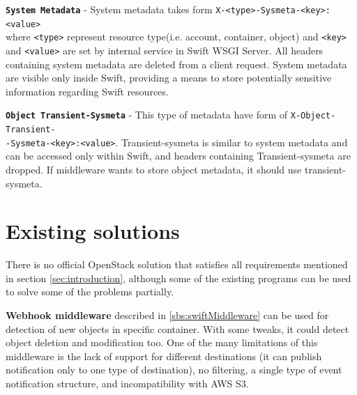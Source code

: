\documentclass{ExcelAtFIT}
\begin{document}
\textbf{\texttt{System Metadata}} - System metadata takes form \texttt{X-<type>-Sysmeta-<key>:<value>}\\ where \texttt{<type>} represent resource type(i.e. account, container, object) and \texttt{<key>} and \texttt{<value>} are set by internal service in Swift WSGI Server. All headers containing system metadata are deleted from a client request. System metadata are visible only inside Swift, providing a means to store potentially sensitive information regarding Swift resources.

\textbf{\texttt{Object Transient-Sysmeta}} - This type of metadata have form of \texttt{X-Object-Transient-\\-Sysmeta-<key>:<value>}. Transient-sysmeta is similar to system metadata and can be accessed only within Swift, and headers containing Transient-sysmeta are dropped. If middleware wants to store object metadata, it should use transient-sysmeta\cite{swiftMiddleware}.


\section{Existing solutions}\label{sec:existingSolutions}
There is no official OpenStack solution that satisfies all requirements mentioned in section \ref{sec:introduction}, although some of the existing programs can be used to solve some of the problems partially.

\textbf{Webhook middleware} described in \ref{sbs:swiftMiddleware} can be used for detection of new objects in specific container. With some tweaks, it could detect object deletion and modification too. One of the many limitations of this middleware is the lack of support for different destinations (it can publish notification only to one type of destination), no filtering, a single type of event notification structure, and incompatibility with AWS S3.
\end{document}
